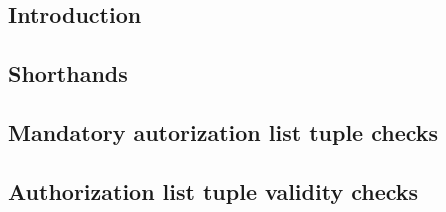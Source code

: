 \subsection{Introduction}                               \label{rlp auth: comparisons: intro}              
\subsection{Shorthands}                                 \label{rlp auth: comparisons: shorthands}         
\subsection{Mandatory autorization list tuple checks}   \label{rlp auth: comparisons: mandatory checks}   
\subsection{Authorization list tuple validity checks}   \label{rlp auth: comparisons: validity checks}    
